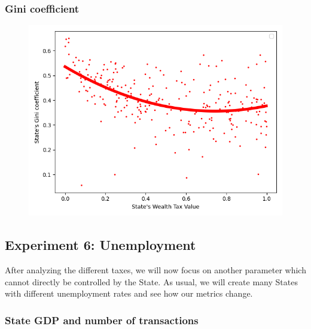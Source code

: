 {{{{{{{        \subsubsection{Gini coefficient}

        \begin{figure}
            \includegraphics[width=\linewidth]{img/exp/5_3.png}
        \end{figure} 
        { \lipsum[1-2] %
        \par


    \subsection{Experiment 6: Unemployment}
    After analyzing the different taxes, we will now focus on another parameter which cannot directly be controlled by the State. As usual, we will create many States with different unemployment rates and see how our metrics change.

            
        \subsubsection{State GDP and number of transactions}

}}}}}}}}
